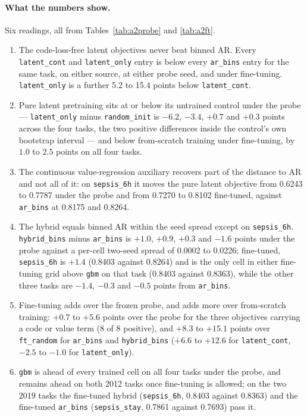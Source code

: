 \documentclass[11pt,a4paper]{article}
\newcommand{\code}[1]{\texttt{\small #1}}
\begin{document}
\paragraph{What the numbers show.} Six readings, all from
Tables~\ref{tab:a2probe} and \ref{tab:a2ft}.
\begin{enumerate}[leftmargin=*,itemsep=2pt,topsep=3pt]
\item The code-loss-free latent objectives never beat binned AR. Every
      \code{latent\_cont} and \code{latent\_only} entry is below every
      \code{ar\_bins} entry for the same task, on either source, at either
      probe seed, and under fine-tuning. \code{latent\_only} is a further
      5.2 to 15.4 points below \code{latent\_cont}.
\item Pure latent pretraining sits at or below its untrained control under the
      probe --- \code{latent\_only} minus \code{random\_init} is $-6.2$,
      $-3.4$, $+0.7$ and $+0.3$ points across the four tasks, the two positive
      differences inside the control's own bootstrap interval --- and below
      from-scratch training under fine-tuning, by $1.0$ to $2.5$ points on all
      four tasks.
\item The continuous value-regression auxiliary recovers part of the distance
      to AR and not all of it: on \code{sepsis\_6h} it moves the pure latent
      objective from 0.6243 to 0.7787 under the probe and from 0.7270 to
      0.8102 fine-tuned, against \code{ar\_bins} at 0.8175 and 0.8264.
\item The hybrid equals binned AR within the seed spread except on
      \code{sepsis\_6h}. \code{hybrid\_bins} minus \code{ar\_bins} is $+1.0$,
      $+0.9$, $+0.3$ and $-1.6$ points under the probe against a per-cell
      two-seed spread of 0.0002 to 0.0226; fine-tuned, \code{sepsis\_6h} is
      $+1.4$ (0.8403 against 0.8264) and is the only cell in either
      fine-tuning grid above \code{gbm} on that task (0.8403 against 0.8363),
      while the other three tasks are $-1.4$, $-0.3$ and $-0.5$ points from
      \code{ar\_bins}.
\item Fine-tuning adds over the frozen probe, and adds more over from-scratch
      training: $+0.7$ to $+5.6$ points over the probe for the three
      objectives carrying a code or value term (8 of 8 positive), and
      $+8.3$ to $+15.1$ points over \code{ft\_random} for \code{ar\_bins} and
      \code{hybrid\_bins} ($+6.6$ to $+12.6$ for \code{latent\_cont},
      $-2.5$ to $-1.0$ for \code{latent\_only}).
\item \code{gbm} is ahead of every trained cell on all four tasks under the
      probe, and remains ahead on both 2012 tasks once fine-tuning is allowed;
      on the two 2019 tasks the fine-tuned hybrid (\code{sepsis\_6h}, 0.8403
      against 0.8363) and the fine-tuned \code{ar\_bins}
      (\code{sepsis\_stay}, 0.7861 against 0.7693) pass it.
\end{enumerate}
\end{document}
